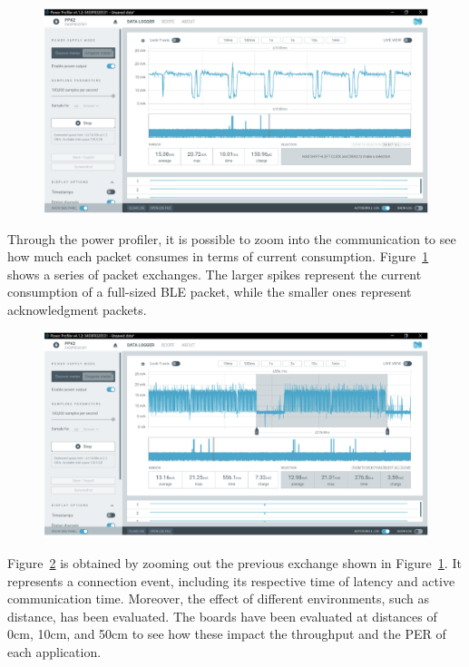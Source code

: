 \documentclass{Configuration_Files/PoliMi3i_thesis}
\begin{document}
\begin{figure}[h]
    \centering
    \includegraphics[scale=0.3]{Test_Procedure/18.png}
    \label{fig:current_measurement_BLE_communication}
\end{figure}

Through the power profiler, it is possible to zoom into the communication to see how much each packet consumes in terms of current consumption. Figure~\ref{fig:current_measurement_BLE_communication} shows a series of packet exchanges. The larger spikes represent the current consumption of a full-sized BLE packet, while the smaller ones represent acknowledgment packets.

\begin{figure}[h]
    \centering
    \includegraphics[scale=0.3]{Test_Procedure/19.png}
    \label{fig:current_consumption_connection_interval}
\end{figure}

Figure~\ref{fig:current_consumption_connection_interval} is obtained by zooming out the previous exchange shown in Figure~\ref{fig:current_measurement_BLE_communication}. It represents a connection event, including its respective time of latency and active communication time. Moreover, the effect of different environments, such as distance, has been evaluated. The boards have been evaluated at distances of 0cm, 10cm, and 50cm to see how these impact the throughput and the PER of each application.
\end{document}
